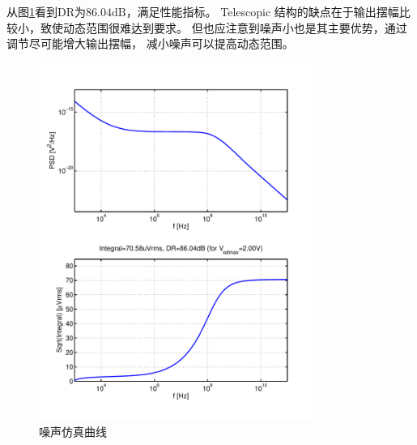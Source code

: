 \documentclass[a4paper]{article}
\newcommand{\udB}{\si{\deci\bel}}
\begin{document}
从图\ref{commonnoise}看到DR为$86.04\udB$，满足性能指标。
Telescopic 结构的缺点在于输出摆幅比较小，致使动态范围很难达到要求。
但也应注意到噪声小也是其主要优势，通过调节尽可能增大输出摆幅，
减小噪声可以提高动态范围。
\begin{figure}[htb]
    \begin{center}
        \includegraphics[width=0.8\textwidth]{common/noise.pdf}
    \end{center}
    \caption{噪声仿真曲线}
    \label{commonnoise}
\end{figure}

\newpage
\clearpage
\end{document}
